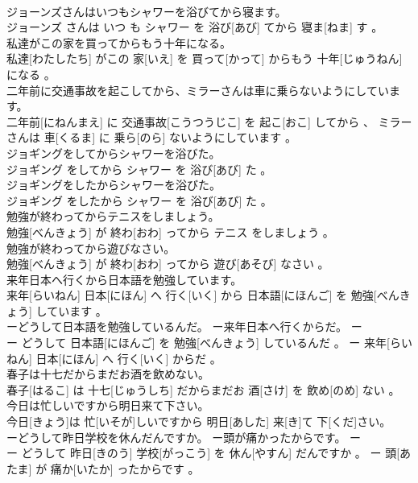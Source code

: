 \documentclass[8pt]{extreport}
\begin{document}
\begin{CJK}{UTF8}{min}
\\	ジョーンズさんはいつもシャワーを浴びてから寝ます。	
\\	ジョーンズ さんは いつ も シャワー を 浴び[あび] てから 寝ま[ねま] す 。
\\	私達がこの家を買ってからもう十年になる。	
\\	私達[わたしたち] がこの 家[いえ] を 買って[かって] からもう 十年[じゅうねん] になる 。
\\	二年前に交通事故を起こしてから、ミラーさんは車に乗らないようにしています。	
\\	二年前[にねんまえ] に 交通事故[こうつうじこ] を 起こ[おこ] してから 、 ミラー さんは 車[くるま] に 乗ら[のら] ないようにしています 。
\\	ジョギングをしてからシャワーを浴びた。	
\\	ジョギング をしてから シャワー を 浴び[あび] た 。
\\	ジョギングをしたからシャワーを浴びた。	
\\	ジョギング をしたから シャワー を 浴び[あび] た 。
\\	勉強が終わってからテニスをしましょう。	
\\	勉強[べんきょう] が 終わ[おわ] ってから テニス をしましょう 。
\\	勉強が終わってから遊びなさい。	
\\	勉強[べんきょう] が 終わ[おわ] ってから 遊び[あそび] なさい 。
\\	来年日本へ行くから日本語を勉強しています。	
\\	来年[らいねん] 日本[にほん] へ 行く[いく] から 日本語[にほんご] を 勉強[べんきょう] しています 。
\\	ーどうして日本語を勉強しているんだ。 ー来年日本へ行くからだ。	ー
\\	ー どうして 日本語[にほんご] を 勉強[べんきょう] しているんだ 。 ー 来年[らいねん] 日本[にほん] へ 行く[いく] からだ 。
\\	春子は十七だからまだお酒を飲めない。	
\\	春子[はるこ] は 十七[じゅうしち] だからまだお 酒[さけ] を 飲め[のめ] ない 。
\\	今日は忙しいですから明日来て下さい。	
\\	今日[きょう]は 忙[いそが]しいですから 明日[あした] 来[き]て 下[くだ]さい。
\\	ーどうして昨日学校を休んだんですか。 ー頭が痛かったからです。	ー
\\	ー どうして 昨日[きのう] 学校[がっこう] を 休ん[やすん] だんですか 。 ー 頭[あたま] が 痛か[いたか] ったからです 。

\end{CJK}
\end{document}
